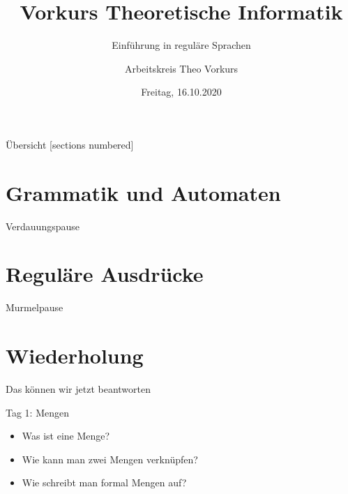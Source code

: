 

\title{Vorkurs Theoretische Informatik}
\subtitle{Einführung in reguläre Sprachen}
\date{Freitag, 16.10.2020}
\author{Arbeitskreis  Theo Vorkurs}



\maketitle

\begin{frame}[fragile]{Übersicht}
  [sections numbered]
  \tableofcontents%
\end{frame}


\section{Grammatik und Automaten}



\begin{frame}[standout]
  Verdauungspause
\end{frame}

\section{Reguläre Ausdrücke}



\begin{frame}[standout]
  Murmelpause
\end{frame}

\section{Wiederholung}
\begin{frame}[fragile]{Das können wir jetzt beantworten}
	\begin{alertblock}{Tag 1: Mengen}
		\begin{itemize}
			\item Was ist eine Menge?
			\item Wie kann man zwei Mengen verknüpfen?
			\item Wie schreibt man formal Mengen auf?
		\end{itemize}
	\end{alertblock}
\end{frame}

